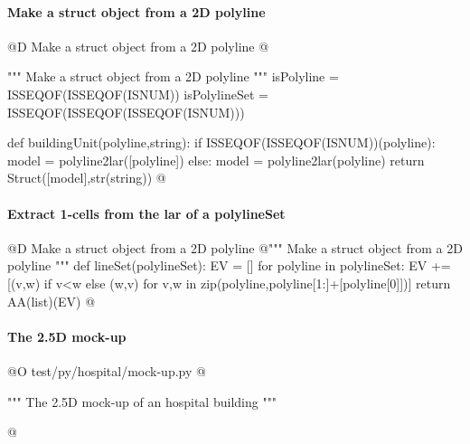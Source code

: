 \documentclass[11pt,oneside]{article}    %
\begin{document}
\paragraph{Make a struct object from a 2D polyline}
@D Make a struct object from a 2D polyline
@{""" Make a struct object from a 2D polyline """
isPolyline = ISSEQOF(ISSEQOF(ISNUM))
isPolylineSet = ISSEQOF(ISSEQOF(ISSEQOF(ISNUM)))

def buildingUnit(polyline,string):
    if ISSEQOF(ISSEQOF(ISNUM))(polyline): model = polyline2lar([polyline])
    else: model = polyline2lar(polyline)
    return Struct([model],str(string))
@}

\paragraph{Extract 1-cells from the lar of a polylineSet}
@D Make a struct object from a 2D polyline
@{""" Make a struct object from a 2D polyline """
def lineSet(polylineSet):
    EV = []
    for polyline in polylineSet:
        EV += [(v,w) if v<w else (w,v) for v,w in zip(polyline,polyline[1:]+[polyline[0]])]
    return AA(list)(EV)
@}
    

\paragraph{The 2.5D mock-up}
@O test/py/hospital/mock-up.py
@{""" The 2.5D mock-up of an hospital building """

@}




\end{document}
